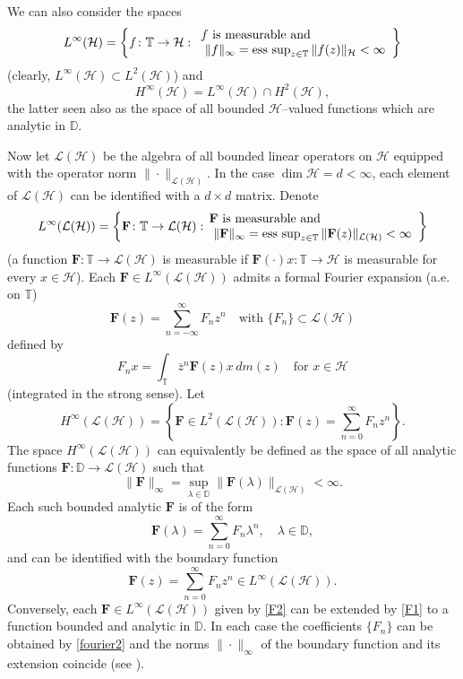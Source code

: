 \documentclass[12pt]{amsart}
\numberwithin{equation}{section}
\DeclareMathOperator{\sees}{\text{\rm ess sup}}
\newcommand{\hsp}{\mathcal{H}}
\newcommand{\oL }{\mathcal{L}(\hsp) }
\newcommand{\F}{{\mathbf{F}}}
\newcommand{\z}{{z}}
\theoremstyle{definition}
\numberwithin{equation}{section}
\begin{document}
 We can also consider the spaces
 $$L^{\infty}(\hsp)=\left\{f\colon\mathbb{T}\to \hsp: \begin{array}{l} f\text{ is measurable and}\\ \ \|f\|_{\infty}=\sees_{\z\in\mathbb{T}}\|f(\z)\|_{\hsp}<\infty\end{array}  \right\}$$
 (clearly, $L^{\infty}(\hsp)\subset L^{2}(\hsp)$) and
 $$H^{\infty}(\hsp)=L^{\infty}(\hsp)\cap H^{2}(\hsp),$$
the latter seen also as the space of all bounded $\hsp$--valued functions which are analytic in $\mathbb{D}$.

Now let $\oL $ be the algebra of all bounded linear operators on $\hsp$ equipped with the operator norm $\|\cdot\|_{\oL}$. In the case $\dim\hsp=d<\infty$, each element of $\oL $ can be identified with a $d\times d$ matrix. Denote
$$L^{\infty}(\oL)=\left\{\F\colon\mathbb{T}\to \oL:\!\!\begin{array}{l} \F\text{ is measurable and}\\ \ \|\F\|_{\infty}=\sees_{\z\in\mathbb{T}}\|\F(\z)\|_{\oL}<\infty\end{array}  \right\}$$
(a function $\F\colon\mathbb{T}\to \oL$ is measurable if $\F(\cdot)x\colon\mathbb{T}\to \hsp$ is measurable for every $x\in \hsp$).
Each $\F\in L^{\infty}(\oL)$ admits a formal Fourier expansion (a.e. on $\mathbb{T}$)
	\begin{equation}\label{jeden}
\mathbf{F}(\z)=\sum_{n=-\infty}^{\infty}{F}_n \z^n\quad\text{with }\{F_n\}\subset  \oL
\end{equation}
defined by
	\begin{equation}\label{fourier2}
F_nx=\int_\mathbb{T} \overline{\z}^n \mathbf{F}(\z)x\,dm(\z) \quad\text{for }  x\in \hsp
\end{equation}
(integrated in the strong sense). Let
$$H^{\infty}(\oL)=\left\{\F\in L^2(\oL): \F(\z)=\sum_{n=0}^{\infty} F_n \z^n\right\}.$$
The space $H^\infty(\oL)$ can equivalently be defined as the space of all analytic functions $\F:\mathbb{D}\to\oL $ such that
$$\|\F\|_{\infty}=\sup_{\lambda\in\mathbb{D}}\|\F(\lambda)\|_{\oL}<\infty.$$
Each such bounded analytic $\F$ is of the form
\begin{equation}
\label{F1}\F(\lambda)=\sum_{n=0}^{\infty}{F}_n\lambda^n,\quad \lambda\in\mathbb{D},
\end{equation}
and can be identified with the boundary function
\begin{equation}\label{F2}
\F(\z)=\sum_{n=0}^{\infty}{F}_n\z^n\in L^{\infty}(\oL).
\end{equation}
Conversely, each $\F\in L^{\infty}(\oL)$ given by \eqref{F2} can be extended by \eqref{F1} to a function bounded and analytic in $\mathbb{D}$. In each case the coefficients $\{F_n\}$ can be obtained by \eqref{fourier2} and the norms $\|\cdot\|_{\infty}$ of the boundary function and its extension coincide (see \cite[p. 232]{berc}).
\end{document}
